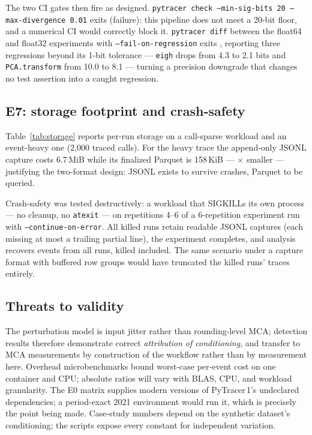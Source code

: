 The two CI gates then fire as designed. \texttt{pytracer check
--min-sig-bits 20 --max-divergence 0.01} exits \checkExit{} (failure):
this pipeline does not meet a 20-bit floor, and a numerical CI would
correctly block it. \texttt{pytracer diff} between the float64 and
float32 experiments with \texttt{--fail-on-regression} exits
\diffExit{}, reporting three regressions beyond its 1-bit tolerance ---
\texttt{eigh} drops from 4.3 to 2.1 bits and \texttt{PCA.transform} from
10.0 to 8.1 --- turning a precision downgrade that changes no test
assertion into a caught regression.

\subsection{E7: storage footprint and crash-safety}
\label{sec:eval-storage}

Table~\ref{tab:storage} reports per-run storage on a call-sparse workload
and an event-heavy one (2{,}000 traced calls). For the heavy trace the
append-only JSONL capture costs 6.7\,MiB while its finalized Parquet is
158\,KiB --- \parquetRatio$\times$ smaller --- justifying the two-format
design: JSONL exists to survive crashes, Parquet to be queried.

\begin{table}[t]
  \centering\small
  \caption{E7 --- per-run storage (mean of 5 runs, full array storage).
  Arrays are Zarr/npy payloads enabling element-wise significance.}
  \label{tab:storage}
  
\end{table}

Crash-safety was tested destructively: a workload that SIGKILLs its own
process --- no cleanup, no \texttt{atexit} --- on repetitions 4--6 of a
6-repetition experiment run with \texttt{--continue-on-error}. All
\crashKilled{} killed runs retain readable JSONL captures (each missing
at most a trailing partial line), the experiment completes, and analysis
recovers events from all \crashRunsRecovered{} runs, killed included. The
same scenario under a capture format with buffered row groups would have
truncated the killed runs' traces entirely.

\subsection{Threats to validity}
\label{sec:eval-threats}

The perturbation model is input jitter rather than rounding-level MCA;
detection results therefore demonstrate correct \emph{attribution of
conditioning}, and transfer to MCA measurements by construction of the
workflow rather than by measurement here. Overhead microbenchmarks bound
worst-case per-event cost on one container and CPU; absolute ratios will
vary with BLAS, CPU, and workload granularity. The E0 matrix supplies
modern versions of PyTracer\,1's undeclared dependencies; a period-exact
2021 environment would run it, which is precisely the point being made.
Case-study numbers depend on the synthetic dataset's conditioning; the
scripts expose every constant for independent variation.
